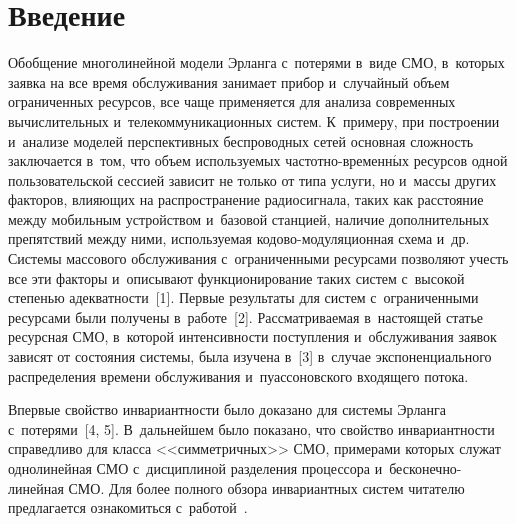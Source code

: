 
  
\vspace*{-2pt}



\thispagestyle{headings}

\begin{multicols}{2}

\label{st\stat}
  

\section{Введение}

\vspace*{-2pt}

  Обобщение многолинейной модели Эрланга с~потерями в~виде СМО, 
  в~которых заявка на все время 
обслуживания занимает прибор и~случайный объем ограниченных ресурсов, 
все чаще применяется для анализа современных вычислительных 
и~телекоммуникационных систем. К~примеру, при построении и~анализе 
моделей перспективных беспроводных сетей основная сложность 
заключается в~том, что объем используемых час\-тот\-но-вре\-мен\-н$\acute{\mbox{ы}}$х 
ресурсов одной пользовательской сессией зависит не только от типа услуги, 
но и~массы других факторов, влияющих на распространение радиосигнала, 
таких как расстояние между мобильным устройством и~базовой станцией, 
наличие дополнительных препятствий между ними, используемая  
ко\-до\-во-мо\-ду\-ля\-ци\-он\-ная схема и~др. Сис\-те\-мы массового обслуживания с~ограниченными 
ресурсами позволяют учесть все эти факторы и~описывают 
функционирование таких сис\-тем с~высокой степенью адекватности~[1]. 
Первые результаты для сис\-тем с~ограниченными ресурсами были получены 
в~работе~[2]. Рассматриваемая в~настоящей статье ресурсная СМО, 
в~которой интенсивности поступления и~обслуживания заявок зависят от 
состояния сис\-те\-мы, была изучена в~[3] в~случае экспоненциального 
распределения времени обслуживания и~пуассоновского входящего потока.
  
  Впервые свойство инвариантности было доказано для сис\-те\-мы Эрланга 
с~потерями~[4, 5]. В~дальнейшем было показано, что свойство 
инвариант\-ности справедливо для класса <<симметричных>> СМО, 
примерами которых служат однолинейная СМО с~дисциплиной разделения 
процессора и~бес\-ко\-неч\-но-ли\-ней\-ная СМО. Для более полного обзора 
инвариантных сис\-тем читателю предлагается ознакомиться 
с~работой~\cite{7-sop}.
  

\end{multicols}
